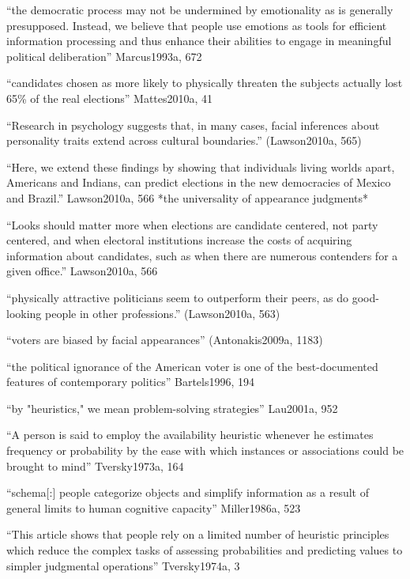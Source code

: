 
		``the democratic process may not be undermined by emotionality as is generally presupposed. Instead, we believe that people use emotions as tools for efficient information processing and thus enhance their abilities to engage in meaningful political deliberation'' Marcus1993a, 672

		``candidates chosen as more likely to physically threaten the subjects actually lost 65\% of the real elections'' Mattes2010a, 41

		``Research in psychology suggests that, in many cases, facial inferences about personality traits extend across cultural boundaries.'' (Lawson2010a, 565)

		``Here, we extend these findings by showing that individuals living worlds apart, Americans and Indians, can predict elections in the new democracies of Mexico and Brazil.'' Lawson2010a, 566 *the universality of appearance judgments*

		``Looks should matter more when elections are candidate centered, not party centered, and when electoral institutions increase the costs of acquiring information about candidates, such as when there are numerous contenders for a given office.'' Lawson2010a, 566

		``physically attractive politicians seem to outperform their peers, as do good-looking people in other professions.'' (Lawson2010a, 563)

		``voters are biased by facial appearances'' (Antonakis2009a, 1183)

		``the political ignorance of the American voter is one of the best-documented features of contemporary politics'' Bartels1996, 194


		``by "heuristics," we mean problem-solving strategies'' Lau2001a, 952
	
		``A person is said to employ the availability heuristic whenever he estimates frequency or probability by the ease with which instances or associations could be brought to mind'' Tversky1973a, 164

		``schema[:] people categorize objects and simplify information as a result of general limits to human cognitive capacity'' Miller1986a, 523




		``This article shows that people rely on a limited number of heuristic principles which reduce the complex tasks of assessing probabilities and predicting values to simpler judgmental operations'' Tversky1974a, 3

